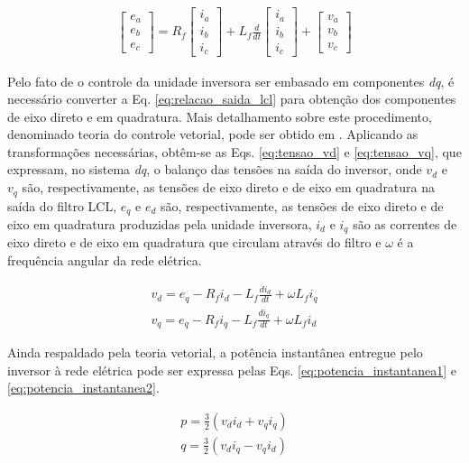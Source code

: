 \begin{align}\label{eq:relacao_saida_lcl}
	\begin{bmatrix}
		e_a \\ e_b \\ e_c
	\end{bmatrix}
	= R_f
	\begin{bmatrix}
		i_a \\ i_b \\ i_c
	\end{bmatrix}
	+ L_f\frac{d}{dt}
	\begin{bmatrix}
		i_a \\ i_b \\ i_c
	\end{bmatrix}
	+
	\begin{bmatrix}
		v_a \\ v_b \\ v_c
	\end{bmatrix}
\end{align}

Pelo fato de o controle da unidade inversora ser embasado em componentes \textit{dq}, é necessário converter a Eq. \ref{eq:relacao_saida_lcl} para obtenção dos componentes de eixo direto e em quadratura. Mais detalhamento sobre este procedimento, denominado teoria do controle vetorial, pode ser obtido em \cite{book-remusteodorescu201b1}. Aplicando as transformações necessárias, obtêm-se as Eqs. \ref{eq:tensao_vd} e \ref{eq:tensao_vq}, que expressam, no sistema \textit{dq}, o balanço das tensões na saída do inversor, onde $v_d$ e $v_q$ são, respectivamente, as tensões de eixo direto e de eixo em quadratura na saída do filtro LCL, $e_q$ e $e_d$ são, respectivamente, as tensões de eixo direto e de eixo em quadratura produzidas pela unidade inversora, $i_d$ e $i_q$ são as correntes de eixo direto e de eixo em quadratura que circulam através do filtro e $\omega$ é a frequência angular da rede elétrica.

\begin{align}
	v_d = e_q - R_fi_d - L_f \frac{di_d}{dt} + \omega L_fi_q\label{eq:tensao_vd}\\
	v_q = e_q - R_fi_q - L_f\frac{di_q}{dt} + \omega L_fi_d\label{eq:tensao_vq}
\end{align}

Ainda respaldado pela teoria vetorial, a potência instantânea entregue pelo inversor à rede elétrica pode ser expressa pelas Eqs. \ref{eq:potencia_instantanea1} e \ref{eq:potencia_instantanea2}. 

\begin{align}
	p = \frac{3}{2}(v_di_d + v_qi_q)\label{eq:potencia_instantanea1}\\
	q = \frac{3}{2}(v_di_q - v_qi_d)\label{eq:potencia_instantanea2}
\end{align}

